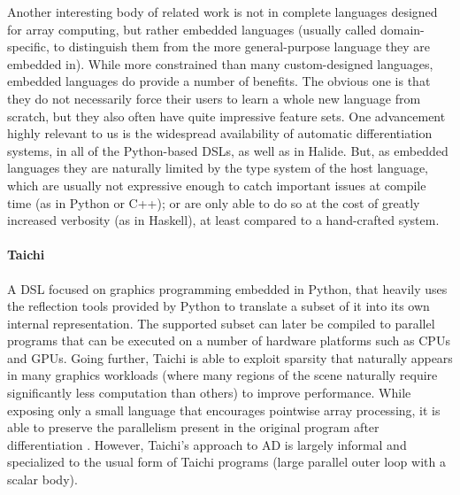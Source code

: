 \documentclass[acmsmall,screen,nonacm]{acmart}
\begin{document}
Another interesting body of related work is not in complete languages designed for array computing, but rather embedded languages (usually called domain-specific, to distinguish them from the more general-purpose language they are embedded in).
While more constrained than many custom-designed languages, embedded languages do provide a number of benefits.
The obvious one is that they do not necessarily force their users to learn a whole new language from scratch, but they also often have quite impressive feature sets.
One advancement highly relevant to us is the widespread availability of automatic differentiation systems, in all of the Python-based DSLs, as well as in Halide.
But, as embedded languages they are naturally limited by the type system of the host language, which are usually not expressive enough to catch important issues at compile time (as in Python or C++); or are only able to do so at the cost of greatly increased verbosity (as in Haskell), at least compared to a hand-crafted system.

\paragraph{Taichi \cite{hu2019taichi}}
\label{sec:taichi}
A DSL focused on graphics programming embedded in Python, that heavily uses the reflection tools provided by Python to translate a subset of it into its own internal representation.
The supported subset can later be compiled to parallel programs that can be executed on a number of hardware platforms such as CPUs and GPUs.
Going further, Taichi is able to exploit sparsity that naturally appears in many graphics workloads (where many regions of the scene naturally require significantly less computation than others) to improve performance.
While exposing only a small language that encourages pointwise array processing, it is able to preserve the parallelism present in the original program after differentiation \cite{hu2020difftaichi}.
However, Taichi's approach to AD is largely informal and specialized to the usual form of Taichi programs (large parallel outer loop with a scalar body).
\end{document}
